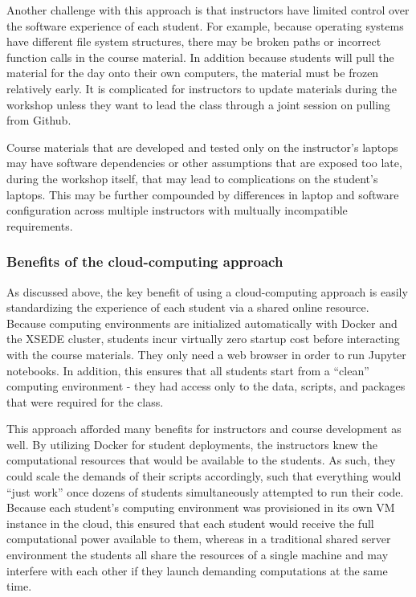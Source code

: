 Another challenge with this approach is that instructors have limited control
over the software experience of each student. For example, because operating
systems have different file system structures, there may be broken paths or
incorrect function calls in the course material. In addition because students
will pull the material for the day onto their own computers, the material must
be frozen relatively early. It is complicated for instructors to update
materials during the workshop unless they want to lead the class through a joint
session on pulling from Github.

Course materials that are developed and tested only on the instructor’s laptops
may have software dependencies or other assumptions that are exposed too late,
during the workshop itself, that may lead to complications on the student’s
laptops. This may be further compounded by differences in laptop and software
configuration across multiple instructors with multually incompatible
requirements.

\subsubsection{Benefits of the cloud-computing approach}

As discussed above, the key benefit of using a cloud-computing approach is
easily standardizing the experience of each student via a shared online
resource. Because computing environments are initialized automatically with
Docker and the XSEDE cluster, students incur virtually zero startup cost before
interacting with the course materials. They only need a web browser in order to
run Jupyter notebooks. In addition, this ensures that all students start from a
``clean'' computing environment - they had access only to the data, scripts, and
packages that were required for the class.

This approach afforded many benefits for instructors and course development as
well. By utilizing Docker for student deployments, the instructors knew the
computational resources that would be available to the students. As such, they
could scale the demands of their scripts accordingly, such that everything would
``just work'' once dozens of students simultaneously attempted to run their
code. Because each student’s computing environment was provisioned in its own VM
instance in the cloud, this ensured that each student would receive the full
computational power available to them, whereas in a traditional shared server
environment the students all share the resources of a single machine and may
interfere with each other if they launch demanding computations at the same
time.

